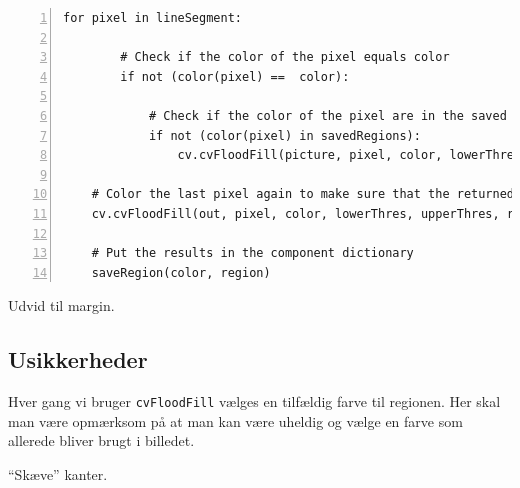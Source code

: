 {\begin{lstlisting}[caption={Metoder til rekonstruktion af
    kørsler},captionpos=b,label={rekonst_koersel},numbers=left]
    for pixel in lineSegment:

        # Check if the color of the pixel equals color
        if not (color(pixel) ==  color):

            # Check if the color of the pixel are in the saved regions
            if not (color(pixel) in savedRegions):
                cv.cvFloodFill(picture, pixel, color, lowerThres, upperThres, region)

    # Color the last pixel again to make sure that the returned component is the entire region
    cv.cvFloodFill(out, pixel, color, lowerThres, upperThres, region)

    # Put the results in the component dictionary
    saveRegion(color, region)
\end{lstlisting}

Udvid til margin.

\subsection{Usikkerheder}
Hver gang vi bruger \texttt{cvFloodFill} vælges en tilfældig farve til
regionen. Her skal man være opmærksom på at man kan være uheldig og
vælge en farve som allerede bliver brugt i billedet.

``Skæve'' kanter.


%
%
%
%
%
%

}

